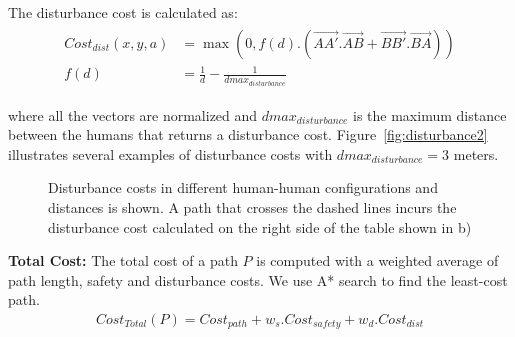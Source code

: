 The disturbance cost is calculated as:
\begin{align} 
\begin{split} 
Cost_{dist}(x,y,a)&=\max(0, f(d).(\vec{AA'}.\vec{AB}+\vec{BB'}.\vec{BA})) \\
f(d)&=\frac{1}{d}-\frac{1}{dmax_{disturbance}}
\end{split} 
\end{align}

where all the vectors are normalized and $dmax_{disturbance}$ is the maximum distance between the humans that returns a disturbance cost. Figure~\ref{fig:disturbance2} illustrates several examples of disturbance costs with $dmax_{disturbance}=3$ meters.

\begin{figure}[ht!]
\centering
%
    \caption{%
	Disturbance costs in different human-human configurations and distances is shown. A path that crosses the dashed lines incurs the disturbance cost calculated on the right side of the table shown in b)
     }%
   \label{fig:disturbance}
   \vspace{-0.2cm}
\end{figure}

\textbf{Total Cost:} The total cost of a path $P$ is computed with a weighted average of path length, safety and disturbance costs. We use A* search to find the least-cost path.
\begin{align}
Cost_{Total}(P) = Cost_{path}+w_{s}.Cost_{safety} + w_d.Cost_{dist}
\end{align}

